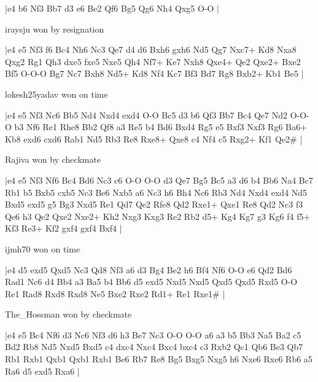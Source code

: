\makegametitle
|e4 b6 Nf3 Bb7 d3 e6 Be2 Qf6 Bg5 Qg6 Nh4 Qxg5 O-O  |

\showboard

iraysju won by resignation

\makegametitle
|e4 e5 Nf3 f6 Bc4 Nh6 Nc3 Qe7 d4 d6 Bxh6 gxh6 Nd5 Qg7 Nxc7+ Kd8 Nxa8 Qxg2 Rg1 Qh3 dxe5 fxe5 Nxe5 Qh4 Nf7+ Ke7 Nxh8 Qxe4+ Qe2 Qxe2+ Bxe2 Bf5 O-O-O Bg7 Nc7 Bxh8 Nd5+ Kd8 Nf4 Kc7 Bf3 Bd7 Rg8 Bxb2+ Kb1 Be5  |

\showboard

lokesh25yadav won on time

\makegametitle
|e4 e5 Nf3 Nc6 Bb5 Nd4 Nxd4 exd4 O-O Bc5 d3 b6 Qf3 Bb7 Bc4 Qe7 Nd2 O-O-O b3 Nf6 Re1 Rhe8 Bb2 Qf8 a3 Re5 b4 Bd6 Bxd4 Rg5 e5 Bxf3 Nxf3 Rg6 Ba6+ Kb8 exd6 cxd6 Rab1 Nd5 Rb3 Re8 Rxe8+ Qxe8 c4 Nf4 c5 Rxg2+ Kf1 Qe2\#  |

\showboard

Rajiva won by checkmate

\makegametitle
|e4 e5 Nf3 Nf6 Bc4 Bd6 Nc3 c6 O-O O-O d3 Qe7 Bg5 Bc5 a3 d6 b4 Bb6 Na4 Bc7 Rb1 b5 Bxb5 cxb5 Nc3 Be6 Nxb5 a6 Nc3 h6 Bh4 Nc6 Rb3 Nd4 Nxd4 exd4 Nd5 Bxd5 exd5 g5 Bg3 Nxd5 Re1 Qd7 Qe2 Rfe8 Qd2 Rxe1+ Qxe1 Re8 Qd2 Nc3 f3 Qe6 h3 Qe2 Qxe2 Nxe2+ Kh2 Nxg3 Kxg3 Re2 Rb2 d5+ Kg4 Kg7 g3 Kg6 f4 f5+ Kf3 Re3+ Kf2 gxf4 gxf4 Bxf4  |

\showboard

ijmh70 won on time

\makegametitle
|e4 d5 exd5 Qxd5 Nc3 Qd8 Nf3 a6 d3 Bg4 Be2 h6 Bf4 Nf6 O-O e6 Qd2 Bd6 Rad1 Nc6 d4 Bb4 a3 Ba5 b4 Bb6 d5 exd5 Nxd5 Nxd5 Qxd5 Qxd5 Rxd5 O-O Re1 Rad8 Rxd8 Rxd8 Ne5 Bxe2 Rxe2 Rd1+ Re1 Rxe1\#  |

\showboard

The\_Hossman won by checkmate

\makegametitle
|e4 e5 Bc4 Nf6 d3 Nc6 Nf3 d6 h3 Be7 Nc3 O-O O-O a6 a3 b5 Bb3 Na5 Ba2 c5 Bd2 Rb8 Nd5 Nxd5 Bxd5 c4 dxc4 Nxc4 Bxc4 bxc4 c3 Rxb2 Qc1 Qb6 Be3 Qb7 Rb1 Rxb1 Qxb1 Qxb1 Rxb1 Be6 Rb7 Re8 Bg5 Bxg5 Nxg5 h6 Nxe6 Rxe6 Rb6 a5 Ra6 d5 exd5 Rxa6  |

